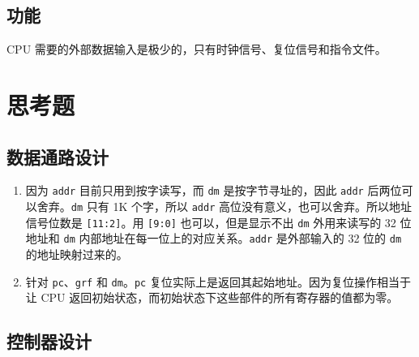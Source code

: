 \documentclass[12pt,AutoFakeBold,AutoFakeSlant]{article}
\begin{document}
\hypertarget{ux529fux80fd-14}{%
\subsection{功能}\label{ux529fux80fd-14}}

CPU 需要的外部数据输入是极少的，只有时钟信号、复位信号和指令文件。

\section{思考题}

\subsection{数据通路设计}

\begin{enumerate}
\item 因为 \texttt{addr} 目前只用到按字读写，而 \texttt{dm} 是按字节寻址的，因此 \texttt{addr} 后两位可以舍弃。\texttt{dm} 只有 1K 个字，所以 \texttt{addr} 高位没有意义，也可以舍弃。所以地址信号位数是 \texttt{[11:2]}。用 \texttt{[9:0]} 也可以，但是显示不出 \texttt{dm} 外用来读写的 32 位地址和 \texttt{dm} 内部地址在每一位上的对应关系。\texttt{addr} 是外部输入的 32 位的 \texttt{dm} 的地址映射过来的。
\item 针对 \texttt{pc}、\texttt{grf} 和 \texttt{dm}。\texttt{pc} 复位实际上是返回其起始地址。因为复位操作相当于让 CPU 返回初始状态，而初始状态下这些部件的所有寄存器的值都为零。
\end{enumerate}

\subsection{控制器设计}
\end{document}
